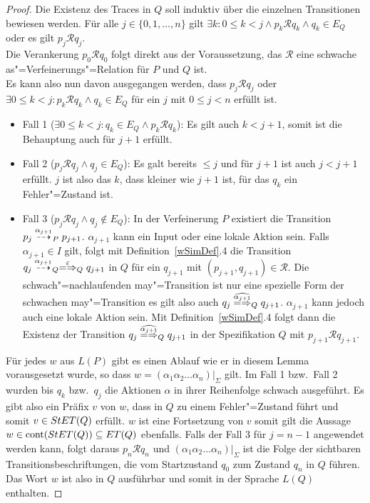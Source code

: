 \begin{proof}
  Die Existenz des Traces in $Q$ soll induktiv über die einzelnen Transitionen
  bewiesen werden. Für alle $j\in \{0,1,\dots ,n\}$ gilt $\exists k: 0 \leq k
  < j \land p_k \mathcal{R} q_k \land q_k\in E_Q$ oder es gilt $p_j
  \mathcal{R} q_j$.\\
  Die Verankerung $p_0\mathcal{R} q_0$ folgt direkt aus der Voraussetzung, das
  $\mathcal{R}$ eine schwache as"=Verfeinerungs"=Relation für $P$ und $Q$
  ist.\\
  Es kann also nun davon ausgegangen werden, dass $p_j\mathcal{R} q_j$ oder
  $\exists 0 \leq k < j: p_k \mathcal{R} q_k \land q_k \in E_Q$ für ein $j$ mit
  $0\leq j < n$ erfüllt ist.
  \begin{itemize}
    \item Fall 1 ($\exists 0 \leq k < j: q_k\in E_Q \land p_k \mathcal{R}
      q_k$): Es gilt auch $k < j+1$, somit ist die Behauptung auch für $j+1$
      erfüllt.
    \item Fall 2 ($p_j\mathcal{R} q_j \land q_j\in E_Q$): Es galt bereits $
      \leq j$ und für $j+1$ ist auch $j < j+1$ erfüllt. $j$ ist also das $k$,
      dass kleiner wie $j+1$ ist, für das $q_k$ ein Fehler"=Zustand ist.
    \item Fall 3 ($p_j \mathcal{R} q_j \land q_j\notin E_Q$): In der
      Verfeinerung $P$ existiert die Transition $p_j \may[\alpha _{j+1}]_P
      p_{j+1}$. $\alpha _{j+1}$ kann ein Input oder eine lokale Aktion sein.
      Falls $\alpha _{j+1}\in I$ gilt, folgt mit Definition~\ref{wSimDef}.4 die
      Transition $q_j \may[\alpha _{j+1}]_Q \weakmay[\varepsilon]_Q q_{j+1}$ in
      $Q$ für ein $q_{j+1}$ mit $(p_{j+1},q_{j+1})\in\mathcal{R}$. Die
      schwach"=nachlaufenden may"=Transition ist nur eine spezielle Form der
      schwachen may"=Transition es gilt also auch $q_j \weakmay[\widehat{\alpha
      _{j+1}}]_Q q_{j+1}$. $\alpha _{j+1}$ kann jedoch auch eine lokale Aktion
      sein. Mit Definition~\ref{wSimDef}.4 folgt dann die Existenz der
      Transition $q_j \weakmay[\widehat{\alpha _{j+1}}]_Q q_{j+1}$ in der
      Spezifikation $Q$ mit $p_{j+1} \mathcal{R} q_{j+1}$.
  \end{itemize}
  Für jedes $w$ aus $L(P)$ gibt es einen Ablauf wie er in diesem Lemma
  vorausgesetzt wurde, so dass $w=(\alpha _1\alpha _2\dots \alpha
  _n)|_{\Sigma}$ gilt. Im Fall 1 bzw.\ Fall 2 wurden bis $q_k$ bzw.\ $q_j$ die
  Aktionen $\alpha$ in ihrer Reihenfolge schwach ausgeführt. Es gibt also ein
  Präfix $v$ von $w$, dass in $Q$ zu einem Fehler"=Zustand führt und somit
  $v\in StET (Q)$ erfüllt. $w$ ist eine Fortsetzung von $v$ somit gilt die
  Aussage $w\in\mathrm{cont} (StET (Q))\subseteq ET (Q)$ ebenfalls. Falls der Fall 3
  für $j = n-1$ angewendet werden kann, folgt daraus $p_n\mathcal{R} q_n$ und
  $(\alpha _1\alpha _2\dots \alpha _n)|_{\Sigma}$ ist die Folge der sichtbaren
  Transitionsbeschriftungen, die vom Startzustand $q_0$ zum Zustand $q_n$ in
  $Q$ führen. Das Wort $w$ ist also in $Q$ ausführbar und somit in der Sprache
  $L(Q)$ enthalten.
\end{proof}

